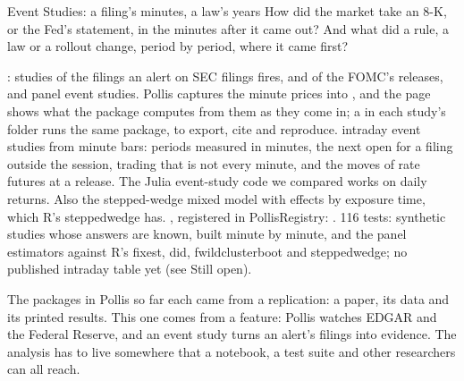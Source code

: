   {Event Studies: a filing's minutes, a law's years}
  {How did the market take an 8-K, or the Fed's statement, in the minutes after it came out? And what did a rule, a law
   or a rollout change, period by period, where it came first?}

\factsheet
  {: studies of the filings an alert on SEC filings fires, and of the
   FOMC's releases, and panel event studies. Pollis captures the minute prices into
   , and the page shows what the package computes from them as they come in;
   a  in each study's folder runs the same package, to export, cite and reproduce.}
  {intraday event studies from minute bars: periods measured in minutes, the next open for a filing outside the session,
   trading that is not every minute, and the moves of rate futures at a release. The Julia event-study code we compared
   works on daily returns. Also the stepped-wedge mixed model with effects by exposure time, which R's steppedwedge
   has.}
  {, registered in PollisRegistry: .}
  {116 tests: synthetic studies whose answers are known, built minute by minute, and the panel estimators against R's
   fixest, did, fwildclusterboot and steppedwedge; no published intraday table yet (see Still open).}

The packages in Pollis so far each came from a replication: a paper, its data and its printed results. This one comes
from a feature: Pollis watches EDGAR and the Federal Reserve, and an event study turns an alert's filings into evidence.
The analysis has to live somewhere that a notebook, a test suite and other researchers can all reach.

